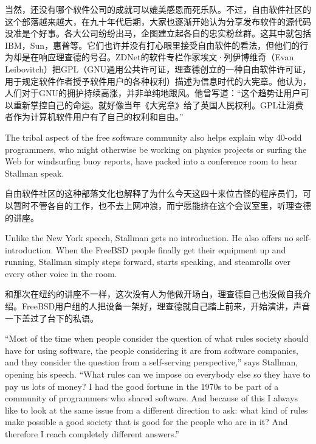 \ifdefined\chs
当然，还没有哪个软件公司的成就可以媲美感恩而死乐队。不过，自由软件社区的这个部落越来越大，在九十年代后期，大家也逐渐开始认为分享发布软件的源代码没准是个好事。各大公司纷纷出马，企图建立起各自的忠实粉丝群。这其中就包括IBM，Sun，惠普等。它们也许并没有打心眼里接受自由软件的看法，但他们的行为却是在响应理查德的号召。ZDNet的软件专栏作家埃文·列伊博维奇（Evan Leibovitch）把GPL（GNU通用公共许可证，理查德创立的一种自由软件许可证，用于规定软件作者授予软件用户的各种权利）描述为信息时代的大宪章。他认为，人们对于GNU的拥护持续高涨，并非单纯地跟风。他曾写道：``这个趋势让用户可以重新掌控自己的命运。就好像当年《大宪章》给了英国人民权利。GPL让消费者作为计算机软件用户有了自己的权利和自由。''
\fi

\ifdefined\eng
The tribal aspect of the free software community also helps explain why 40-odd programmers, who might otherwise be working on physics projects or surfing the Web for windsurfing buoy reports, have packed into a conference room to hear Stallman speak.
\fi

\ifdefined\chs
自由软件社区的这种部落文化也解释了为什么今天这四十来位古怪的程序员们，可以暂时不管各自的工作，也不去上网冲浪，而宁愿能挤在这个会议室里，听理查德的讲座。
\fi

\ifdefined\eng
Unlike the New York speech, Stallman gets no introduction. He also offers no self-introduction. When the FreeBSD people finally get their equipment up and running, Stallman simply steps forward, starts speaking, and steamrolls over every other voice in the room.
\fi

\ifdefined\chs
和那次在纽约的讲座不一样，这次没有人为他做开场白，理查德自己也没做自我介绍。FreeBSD用户组的人把设备一架好，理查德就自己踏上前来，开始演讲，声音一下盖过了台下的私语。
\fi

\ifdefined\eng
``Most of the time when people consider the question of what rules society should have for using software, the people considering it are from software companies, and they consider the question from a self-serving perspective,'' says Stallman, opening his speech. ``What rules can we impose on everybody else so they have to pay us lots of money? I had the good fortune in the 1970s to be part of a community of programmers who shared software. And because of this I always like to look at the same issue from a different direction to ask: what kind of rules make possible a good society that is good for the people who are in it? And therefore I reach completely different answers.''
\fi

